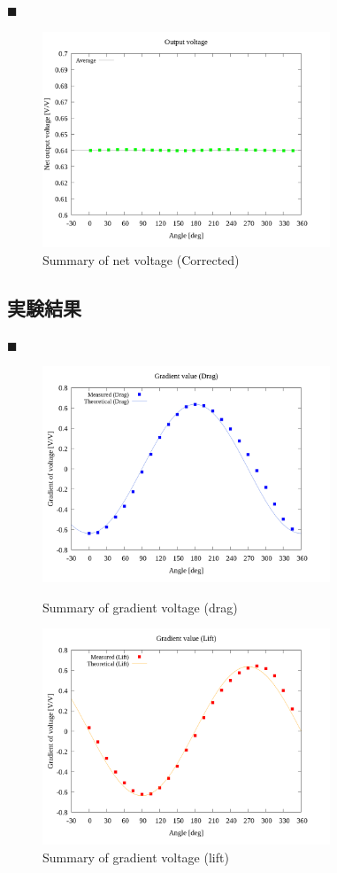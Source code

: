 \documentclass[twocolumn,a4j]{jsarticle}
\begin{document}
$\blacksquare$ 

\begin{figure}[htbp]
    \footnotesize
    \begin{center}
        \includegraphics[width=86mm]{../graphes/simulation/09/09_summary-outputvoltage-net.png}
        \caption{Summary of net voltage (Corrected)}
    \end{center}
\end{figure}

\newpage

\subsection{実験結果}

$\blacksquare$ 

\begin{figure}[htbp]
    \footnotesize
    \begin{center}
        \includegraphics[width=86mm]{../graphes/1-ex/21/21-1_summary_drag.png}
        \caption{Summary of gradient voltage (drag)}
        \includegraphics[width=86mm]{../graphes/1-ex/21/21-1_summary_lift.png}
        \caption{Summary of gradient voltage (lift)}
    \end{center}
\end{figure}
\end{document}
